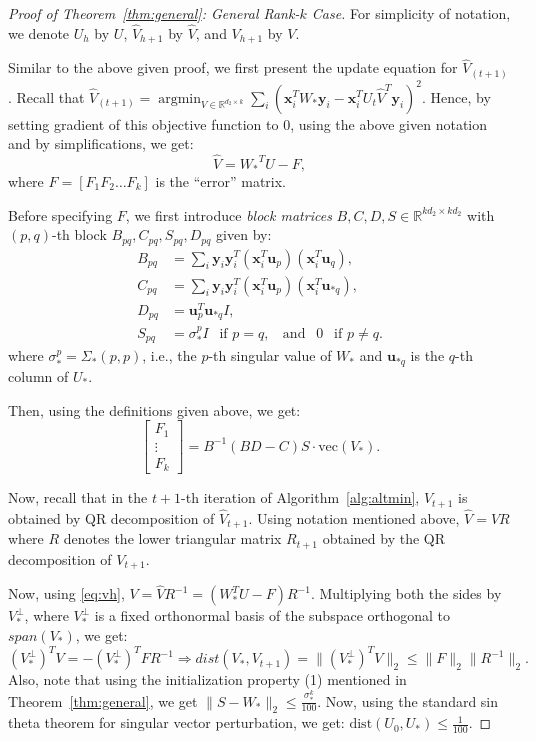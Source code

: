 \documentclass[11pt]{article}
\newcommand{\mvec}{\mathrm{vec}}
\newcommand{\R}{\mathbb{R}}
\newcommand{\tp}[1]{{#1}^{T}}
\newcommand{\wh}[1]{\widehat{#1}}
\newcommand{\dist}{\mathrm{dist}}
\DeclareMathOperator*{\argmin}{argmin}
\renewcommand{\u}{\bm{u}}
\renewcommand{\v}{\bm{v}}
\newcommand{\Vh}{\widehat{V}}
\newcommand{\Ut}{U_{t}}
\newcommand{\Vo}{V_*}
\newcommand{\So}{\Sigma_*}
\newcommand{\Uo}{U_*}
\newcommand{\so}{\sigma_*}
\newcommand{\vh}{\wh{\v}}
\newcommand{\vo}{\v_* }
\newcommand{\Wo}{W_*}
\newcommand{\x}{\bm{x}}
\newcommand{\y}{\bm{y}}
\newcommand{\xit}{\tp{\x}_i}
\newcommand{\yi}{\y_i}
\newcommand{\yit}{\tp{\y}_i}
\newcommand{\Vop}{\Vo^{\perp}}
\begin{document}
\begin{proof}[Proof of Theorem~\ref{thm:general}: General Rank-$k$ Case]
For simplicity of notation, we denote $U_h$ by $U$, $\widehat{V}_{h+1}$ by $\widehat{V}$, and $V_{h+1}$ by $V$. 

Similar to the above given proof, we first present the update equation for $\widehat{V}_{(t+1)}$. 
Recall that $\widehat{V}_{(t+1)}=\argmin_{V\in \R^{d_2\times k}}  \sum_i (\xit\Wo\yi-\xit\Ut \tp{\Vh}\yi)^2$. Hence, by setting gradient of this objective function to $0$, using the above given notation and by simplifications, we get: 
\begin{equation}\label{eq:vh}\Vh=\tp{\Wo}U-F,\end{equation}
where $F=[F_1 F_2 \dots F_k]$ is the ``error'' matrix. 

Before specifying $F$, we first introduce {\em block matrices} $B, C, D, S \in \mathbb{R}^{k d_2 \times k d_2}$ with $(p,q)$-th block $B_{pq}, C_{pq}, S_{pq}, D_{pq}$ given by: 
\begin{align}  \label{eq:Bpq}
  B_{pq}&=\sum_i \yi\yit (\xit \u_{p})(\xit \u_{q}),\\
  C_{pq}&=\sum_i \yi\yit (\xit \u_{p})(\xit \u_{*q}),\label{eq:Cpq}\\
D_{pq}&=\u_p^T\u_{*q}I,\label{eq:Dpq}\\
S_{pq}&=\so^p I \ \  \text{ if }p=q,\ \ \ \ \text{and }\ \ 0\ \  \text{ if }p\neq q.\label{eq:Spq}
\end{align}
where $\so^p=\So(p,p)$, i.e., the $p$-th singular value of $\Wo$ and $\u_{*q}$ is the $q$-th column of $\Uo$. 

Then, using the definitions given above, we get: 
\begin{equation}
  \label{eq:Fi}
  \left[\begin{matrix}F_1\\\vdots\\ F_k\end{matrix}\right]=B^{-1}(BD-C)S\cdot \mvec(\Vo).
\end{equation}

Now, recall that in the $t+1$-th iteration of Algorithm~\ref{alg:altmin}, $V_{t+1}$ is obtained by QR decomposition of $\widehat{V}_{t+1}$. Using notation mentioned above, $\Vh=V R$ where $R$ denotes the lower triangular matrix $R_{t+1}$ obtained by the QR decomposition of $V_{t+1}$. 

Now, using \eqref{eq:vh}, $V=\Vh R^{-1}=(\Wo^TU-F)R^{-1}.$ Multiplying both the sides by $\Vop$, where $\Vop$ is a fixed orthonormal basis of the subspace orthogonal to $span(\Vo)$, we get: 
\begin{equation}
  \label{eq:t2}
  (\Vop)^TV=-(\Vop)^TFR^{-1} \Rightarrow dist(\Vo, V_{t+1})=\|(\Vop)^TV\|_2 \leq \|F\|_2\|R^{-1}\|_2. 
\end{equation}
Also, note that using the initialization property (1) mentioned in Theorem~\ref{thm:general}, we get $\|S-\Wo\|_2\leq \frac{\so^k}{100}$. Now, using the standard sin theta theorem for singular vector perturbation\cite{Li94}, we get: $\dist(U_0, \Uo)\leq \frac{1}{100}$. 


\end{proof}
\end{document}
